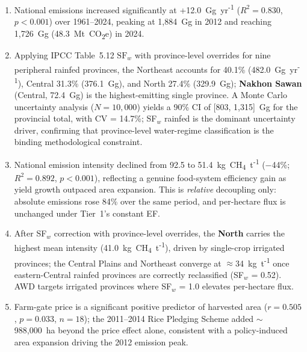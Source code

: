\documentclass[fleqn,10pt]{olplainarticle}
\begin{document}
\begin{enumerate}[noitemsep]
  \item National emissions increased significantly at +12.0~Gg~yr\textsuperscript{-1}
        ($R^2 = 0.830$, $p < 0.001$) over 1961--2024, peaking at 1,884~Gg in 2012
        and reaching 1,726~Gg (48.3~Mt~CO\textsubscript{2}e) in 2024.

  \item Applying IPCC Table~5.12 $\text{SF}_w$ with province-level overrides
        for nine peripheral rainfed provinces, the Northeast accounts for
        40.1\% (482.0~Gg~yr\textsuperscript{-1}), Central 31.3\% (376.1~Gg),
        and North 27.4\% (329.9~Gg); \textbf{Nakhon Sawan} (Central, 72.4~Gg)
        is the highest-emitting single province.
        A Monte Carlo uncertainty analysis ($N = 10{,}000$) yields a 90\% CI of
        [803, 1{,}315]~Gg for the provincial total, with CV = 14.7\%;
        SF$_w$ rainfed is the dominant uncertainty driver, confirming that
        province-level water-regime classification is the binding methodological constraint.

  \item National emission intensity declined from 92.5 to 51.4~kg~CH\textsubscript{4}~t\textsuperscript{-1}
        ($-$44\%; $R^2 = 0.892$, $p < 0.001$), reflecting a genuine food-system efficiency gain
        as yield growth outpaced area expansion.
        This is \textit{relative} decoupling only: absolute emissions rose 84\% over the
        same period, and per-hectare flux is unchanged under Tier~1's constant EF.

  \item   After SF$_w$ correction with province-level overrides, the \textbf{North}
        carries the highest mean intensity (41.0~kg~CH\textsubscript{4}~t\textsuperscript{-1}),
        driven by single-crop irrigated provinces; the Central Plains and
        Northeast converge at $\approx$34~kg~t\textsuperscript{-1} once
        eastern-Central rainfed provinces are correctly reclassified (SF$_w$
        = 0.52).
        AWD targets irrigated provinces where SF$_w$ = 1.0 elevates
        per-hectare flux.

  \item Farm-gate price is a significant positive predictor of harvested area
        ($r = 0.505$, $p = 0.033$, $n = 18$); the 2011--2014 Rice Pledging Scheme
        added $\sim$988,000~ha beyond the price effect alone, consistent with a
        policy-induced area expansion driving the 2012 emission peak.


\end{enumerate}
\end{document}

